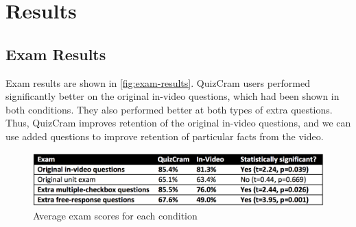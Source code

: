 \documentclass{sigchi}
\begin{document}
\section{Results}

\subsection{Exam Results}

Exam results are shown in \autoref{fig:exam-results}.  QuizCram users performed significantly better on the original in-video questions, which had been shown in both conditions. They also performed better at both types of extra questions. Thus, QuizCram improves retention of the original in-video questions, and we can use added questions to improve retention of particular facts from the video.

\begin{figure}
\centering
\includegraphics[width=1.0\columnwidth]{exam-results}
\caption{Average exam scores for each condition}
\label{fig:exam-results}
\end{figure}



\end{document}
